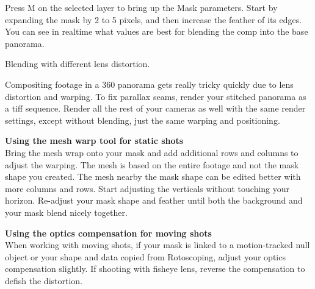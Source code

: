 \begin{fullwidth}

Press M on the selected layer to bring up the Mask parameters. Start by expanding the mask by 2 to 5 pixels, and then increase the feather of its edges. You can see in realtime what values are best for blending the comp into the base panorama. 


{\large Blending with different lens distortion. \par}

Compositing footage in a 360 panorama gets really tricky quickly due to lens distortion and warping. To fix parallax seams, render your stitched panorama as a tiff sequence. Render all the rest of your cameras as well with the same render settings, except without blending, just the same warping and positioning. 

{\bfseries Using the mesh warp tool for static shots}
\\
Bring the mesh wrap onto your mask and add additional rows and columns to adjust the warping. The mesh is based on the entire footage and not the mask shape you created. The mesh nearby the mask shape can be edited better with more columns and rows. Start adjusting the verticals without touching your horizon. Re-adjust your mask shape and feather until both the background and your mask blend nicely together.

{\bfseries Using the optics compensation for moving shots}
\\
When working with moving shots, if your mask is linked to a motion-tracked null object or your shape and data copied from Rotoscoping, adjust your optics compensation slightly. If shooting with fisheye lens, reverse the compensation to defish the distortion. 



\clearpage
\end{fullwidth}